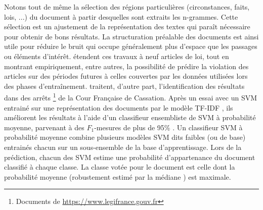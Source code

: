 Notons tout de même la sélection des régions particulières (circonstances, faits, lois, ...) du document à partir desquelles sont extraits les n-grammes. Cette sélection est un ajustement de la représentation des textes qui paraît nécessaire pour obtenir de bons résultats. La structuration préalable des documents est ainsi utile pour réduire le bruit qui occupe généralement plus d'espace que les passages ou éléments d'intérêt.  \citet{medvedeva2018echrCristalBall} étendent ces travaux à neuf articles de loi, tout en montrant empiriquement, entre autres, la possibilité de prédire la violation des articles sur des périodes futures à celles couvertes par les données utilisées lors des phases d'entraînement. \cite{sulea2017legalEnsSVM} traitent, d'autre part, l'identification des résultats dans des arrêts \footnote{Documents de \url{https://www.legifrance.gouv.fr}} de la Cour Française de Cassation. Après un essai \citep{Sulea2017predictareadecision} avec un SVM entrainé sur une représentation des documents par le modèle  TF-IDF \citep{salton1988term-weighting}, ils améliorent les résultats à l'aide d'un classifieur ensembliste de SVM à probabilité moyenne,
 parvenant à des $F_1$-mesures de plus de 95\% \cite{sulea2017legalEnsSVM}. Un classifieur SVM à probabilité moyenne combine plusieurs modèles SVM dits \og faibles \fg{} (ou de base)  entrainés chacun sur un sous-ensemble de la base d'apprentissage.
Lors de la prédiction, chacun des SVM estime une probabilité d'appartenance du document classifié à chaque classe. La classe votée pour le document est celle dont la  probabilité moyenne (robustement estimé par la médiane \citep{kittler1998combiningClassifiers}) est maximale.

